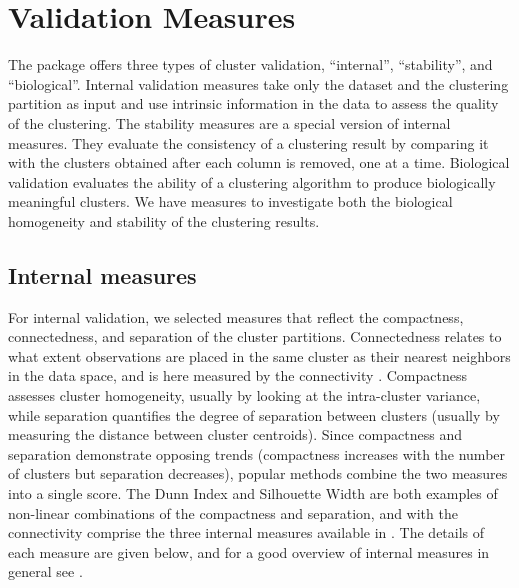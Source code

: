 \documentclass[11pt]{article}
\begin{document}
\section{Validation Measures}
\label{sec:measures}


The  package offers three types of cluster
validation, ``internal'', ``stability'', and ``biological''.  
Internal validation measures take only the dataset and the clustering
partition as input and use intrinsic information in the data to
assess the quality of the clustering.  
The stability measures are a special version of internal measures.
They evaluate the consistency of a clustering result by comparing it
with the clusters obtained after each column is removed, one at a time.
Biological validation evaluates the ability of a clustering algorithm
to produce biologically meaningful clusters.  We have measures
to investigate both the biological homogeneity and stability of the
clustering results.



\subsection{Internal measures}
\label{subsec:internal}


For internal validation, we selected measures that reflect the
compactness, connectedness, and separation of the cluster
partitions.  Connectedness relates to what extent observations are placed in the same
cluster as their nearest neighbors in the data space, and is here measured
by the connectivity \citep{Han2005}.  Compactness assesses cluster homogeneity, usually by
looking at the intra-cluster variance, while separation quantifies the
degree of separation between clusters (usually by measuring the
distance between cluster centroids).  Since compactness and separation
demonstrate opposing trends (compactness increases with the number of
clusters but separation decreases), popular methods combine the two
measures into a single score.  The Dunn Index \citep{Dun1974} and Silhouette
Width \citep{Rou1987} are
both examples of non-linear combinations of the compactness and
separation, 
and with the connectivity comprise the three internal measures
available in .  The details of each measure are given
below, and for a good overview of internal measures in general see \citet{Han2005}.
\end{document}
